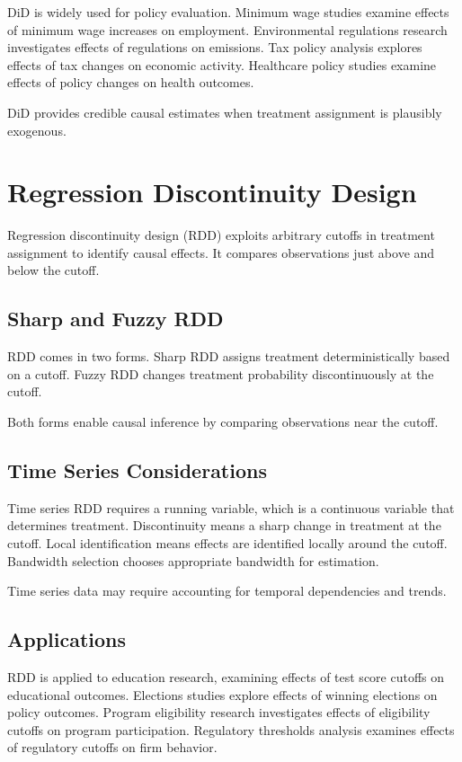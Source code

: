 DiD is widely used for policy evaluation. Minimum wage studies examine effects of minimum wage increases on employment. Environmental regulations research investigates effects of regulations on emissions. Tax policy analysis explores effects of tax changes on economic activity. Healthcare policy studies examine effects of policy changes on health outcomes.

DiD provides credible causal estimates when treatment assignment is plausibly exogenous.

\section{Regression Discontinuity Design}

Regression discontinuity design (RDD) exploits arbitrary cutoffs in treatment assignment to identify causal effects. It compares observations just above and below the cutoff.

\subsection{Sharp and Fuzzy RDD}

RDD comes in two forms. Sharp RDD assigns treatment deterministically based on a cutoff. Fuzzy RDD changes treatment probability discontinuously at the cutoff.

Both forms enable causal inference by comparing observations near the cutoff.

\subsection{Time Series Considerations}

Time series RDD requires a running variable, which is a continuous variable that determines treatment. Discontinuity means a sharp change in treatment at the cutoff. Local identification means effects are identified locally around the cutoff. Bandwidth selection chooses appropriate bandwidth for estimation.

Time series data may require accounting for temporal dependencies and trends.

\subsection{Applications}

RDD is applied to education research, examining effects of test score cutoffs on educational outcomes. Elections studies explore effects of winning elections on policy outcomes. Program eligibility research investigates effects of eligibility cutoffs on program participation. Regulatory thresholds analysis examines effects of regulatory cutoffs on firm behavior.


